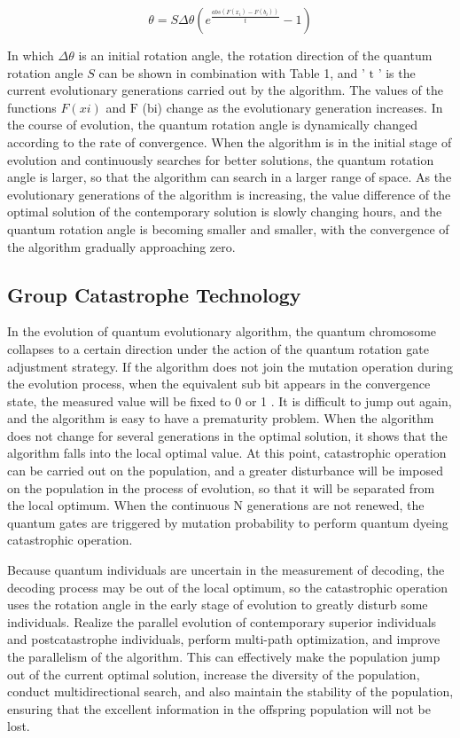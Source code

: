 \documentclass[10pt]{article}
\begin{document}
$$
\theta=S \Delta \theta\left(e^{\frac{a b s\left(F\left(x_{i}\right)-F\left(b_{i}\right)\right)}{t}}-1\right)
$$

In which $\Delta \theta$ is an initial rotation angle, the rotation direction of the quantum rotation angle $S$ can be shown in combination with Table 1, and ' $\mathrm{t}$ ' is the current evolutionary generations carried out by the algorithm. The values of the functions $F(x i)$ and $\mathrm{F}$ (bi) change as the evolutionary generation increases. In the course of evolution, the quantum rotation angle is dynamically changed according to the rate of convergence. When the algorithm is in the initial stage of evolution and continuously searches for better solutions, the quantum rotation angle is larger, so that the algorithm can search in a larger range of space. As the evolutionary generations of the algorithm is increasing, the value difference of the optimal solution of the contemporary solution is slowly changing hours, and the quantum rotation angle is becoming smaller and smaller, with the convergence of the algorithm gradually approaching zero.

\subsection{Group Catastrophe Technology}
In the evolution of quantum evolutionary algorithm, the quantum chromosome collapses to a certain direction under the action of the quantum rotation gate adjustment strategy. If the algorithm does not join the mutation operation during the evolution process, when the equivalent sub bit appears in the convergence state, the measured value will be fixed to 0 or 1 . It is difficult to jump out again, and the algorithm is easy to have a prematurity problem. When the algorithm does not change for several generations in the optimal solution, it shows that the algorithm falls into the local optimal value. At this point, catastrophic operation can be carried out on the population, and a greater disturbance will be imposed on the population in the process of evolution, so that it will be separated from the local optimum. When the continuous $\mathrm{N}$ generations are not renewed, the quantum gates are triggered by mutation probability to perform quantum dyeing catastrophic operation.

Because quantum individuals are uncertain in the measurement of decoding, the decoding process may be out of the local optimum, so the catastrophic operation uses the rotation angle in the early stage of evolution to greatly disturb some individuals. Realize the parallel evolution of contemporary superior individuals and postcatastrophe individuals, perform multi-path optimization, and improve the parallelism of the algorithm. This can effectively make the population jump out of the current optimal solution, increase the diversity of the population, conduct multidirectional search, and also maintain the stability of the population, ensuring that the excellent information in the offspring population will not be lost.
\end{document}
